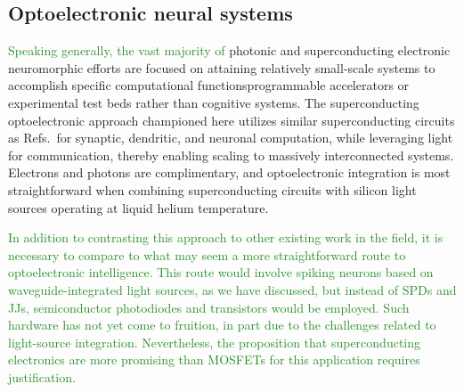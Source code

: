 \documentclass{article}
\newcommand{\onlinecite}[1]{\hspace{-1 ex} \nocite{#1}\citenum{#1}}
\begin{document}
\begin{multicols}{2}
\subsection{Optoelectronic neural systems}
\textcolor{ForestGreen}{Speaking generally, the vast majority of} photonic and superconducting electronic neuromorphic efforts are focused on attaining relatively small-scale systems to accomplish specific computational functions\textemdash programmable accelerators or experimental test beds rather than cognitive systems. The superconducting optoelectronic approach championed here utilizes similar superconducting circuits as Refs.\,\onlinecite{hias2007,sele2017,scdo2018} for synaptic, dendritic, and neuronal computation, while leveraging light for communication, thereby enabling scaling to massively interconnected systems. Electrons and photons are complimentary, and optoelectronic integration is most straightforward when combining superconducting circuits with silicon light sources operating at liquid helium temperature.

\textcolor{ForestGreen}{In addition to contrasting this approach to other existing work in the field, it is necessary to compare to what may seem a more straightforward route to optoelectronic intelligence. This route would involve spiking neurons based on waveguide-integrated light sources, as we have discussed, but instead of SPDs and JJs, semiconductor photodiodes and transistors would be employed. Such hardware has not yet come to fruition, in part due to the challenges related to light-source integration. Nevertheless, the proposition that superconducting electronics are more promising than MOSFETs for this application requires justification.}


\end{multicols}
\end{document}
